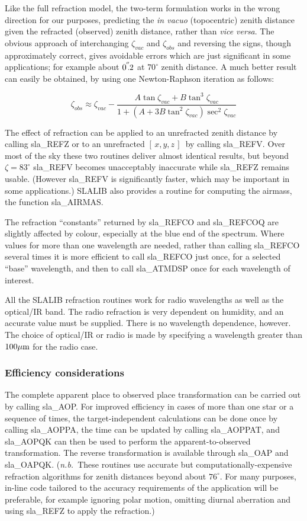 \documentclass[11pt,twoside]{article}
\newcommand{\xyz}       {$[\,x,y,z\,]$}
\newcommand{\arcsec}[2] {\arcseci{#1}$\hspace{-0.4em}.#2$}
\newcommand{\arcsec}[2] {
      {$#1\hspace{-0.05em}^{'\hspace{-0.1em}'}\hspace{-0.4em}.#2$}
   }
\newcommand{\arcseci}[1] {$#1\hspace{-0.05em}$\raisebox{-0.5ex}
                         {$^{'\hspace{-0.1em}'}$}}
\renewcommand{\arcseci}[1] {$#1\hspace{-0.05em}^{'\hspace{-0.1em}'}$}
\begin{document}
Like the full refraction model, the two-term formulation works in the wrong
direction for our purposes, predicting
the {\it in vacuo}\/ (topocentric) zenith distance
given the refracted (observed) zenith distance,
rather than {\it vice versa}.  The obvious approach of
interchanging $\zeta _{vac}$ and $\zeta _{obs}$ and
reversing the signs, though approximately
correct, gives avoidable errors which are just significant in
some applications;  for
example about \arcsec{0}{2} at $70^\circ$ zenith distance.  A
much better result can easily be obtained, by using one Newton-Raphson
iteration as follows:

\[ \zeta _{obs} \approx \zeta _{vac}
    - \frac{A \tan \zeta _{vac} + B \tan ^{3}\zeta _{vac}}
    {1 + ( A + 3 B \tan ^{2}\zeta _{vac} ) \sec ^{2}\zeta _{vac}}\]

The effect of refraction can be applied to an unrefracted
zenith distance by calling
sla\_REFZ or to an unrefracted
\xyz\ by calling
sla\_REFV.
Over most of the sky these two routines deliver almost identical
results, but beyond $\zeta=83^\circ$
sla\_REFV
becomes unacceptably inaccurate while
sla\_REFZ
remains usable.  (However
sla\_REFV
is significantly faster, which may be important in some applications.)
SLALIB also provides a routine for computing the airmass, the function
sla\_AIRMAS.

The refraction ``constants'' returned by
sla\_REFCO and
sla\_REFCOQ
are slightly affected by colour, especially at the blue end
of the spectrum.  Where values for more than one
wavelength are needed, rather than calling
sla\_REFCO
several times it is more efficient to call
sla\_REFCO
just once, for a selected ``base'' wavelength, and then to call
sla\_ATMDSP
once for each wavelength of interest.

All the SLALIB refraction routines work for radio wavelengths as well
as the optical/IR band.  The radio refraction is very dependent on
humidity, and an accurate value must be supplied.  There is no
wavelength dependence, however.  The choice of optical/IR or
radio is made by specifying a wavelength greater than $100\mu {\rm m}$
for the radio case.

\subsubsection{Efficiency considerations}
The complete apparent place to observed place transformation
can be carried out by calling
sla\_AOP.
For improved efficiency
in cases of more than one star or a sequence of times, the
target-independent calculations can be done once by
calling
sla\_AOPPA,
the time can be updated by calling
sla\_AOPPAT,
and
sla\_AOPQK
can then be used to perform the
apparent-to-observed transformation.  The reverse transformation
is available through
sla\_OAP
and
sla\_OAPQK.
({\it n.b.}\ These routines use accurate but computationally-expensive
refraction algorithms for zenith distances beyond about $76^\circ$.
For many purposes, in-line code tailored to the accuracy requirements
of the application will be preferable, for example ignoring
polar motion,
omitting diurnal aberration and using
sla\_REFZ
to apply the refraction.)
\end{document}
